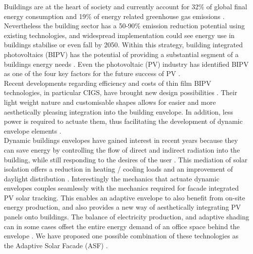 
Buildings are at the heart of society and currently account for 32\% of global final energy consumption and 19\% of energy related greenhouse gas emissions \cite{IPCC}. Nevertheless the building sector has a 50-90\% emission reduction potential using existing technologies, and widespread implementation could see energy use in buildings stabilise or even fall by 2050. Within this strategy, building integrated photovoltaics (BIPV) has the potential of providing a substantial segment of a buildings energy needs \cite{Shoen1997}. Even the photovoltaic (PV) industry has identified BIPV as one of the four key factors for the future success of PV \cite{raugei2009life}. \\

Recent developments regarding efficiency and costs of thin film BIPV technologies, in particular CIGS, have brought new design possibilities \cite{NREL} \cite{kushiya2014cis} \cite{kaelin2004low} \cite{jelle2012building}. Their light weight nature and customisable shapes allows for easier and more aesthetically pleasing integration into the building envelope. In addition, less power is required to actuate them, thus facilitating the development of dynamic envelope elements \cite{rossi2012adaptive}. \\





Dynamic buildings envelopes have gained interest in recent years because they can save energy by controlling the flow of direct and indirect radiation into the building, while still responding to the desires of the user \cite{loonen2013climate}. This mediation of solar isolation offers a reduction in heating / cooling loads and an improvement of daylight distribution \cite{rossi2012adaptive}. Interestingly the mechanics that actuate dynamic envelopes couples seamlessly with the mechanics required for facade integrated PV solar tracking. This enables an adaptive envelope to also benefit from on-site energy production, and also provides a new way of aesthetically integrating PV panels onto buildings. The balance of electricity production, and adaptive shading can in some cases offset the entire energy demand of an office space behind the envelope \cite{jayathissa2015abs}. We have proposed one possible combination of these technologies as the Adaptive Solar Facade (ASF) \cite{nagy2015frontiers}.




